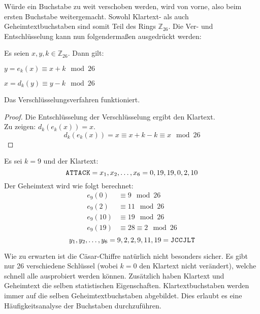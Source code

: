 \noindent
Würde ein Buchstabe zu weit verschoben werden, wird von vorne,
also beim ersten Buchstabe weitergemacht.
Sowohl Klartext- als auch Geheimtextbuchstaben sind somit Teil des Rings $\mathbb{Z}_{26}$.
Die Ver- und Entschlüsselung kann nun folgendermaßen ausgedrückt werden:

\begin{definition}
  Es seien $x,y,k \in \mathbb{Z}_{26}$. Dann gilt:
  \begin{description}[itemsep = 0pt]
    \item[Verschlüsselung:] $y = e_k(x) \equiv x + k \mod{26}$
    \item[Entschlüsselung:] $x = d_k(y) \equiv y - k \mod{26}$
  \end{description}
\end{definition}

\newpage
\noindent
Das Verschlüsselungsverfahren funktioniert.
\begin{proof}
  Die Entschlüsselung der Verschlüsselung ergibt den Klartext. \\
  Zu zeigen: $d_k(e_k(x)) = x$.
  \begin{equation*}
    d_k(e_k(x)) = x \equiv x + k - k \equiv x \mod{26}
  \end{equation*}
\end{proof}
\begin{example}
  Es sei $k = 9$ und der Klartext:
  \begin{equation*}
    \text{\texttt{A\kern 0.2mmT\kern 0.2mmT\kern 0.2mmA\kern 0.2mmC\kern 0.2mmK}}
    = x_1,x_2,\dots,x_6 = 0,19,19,0,2,10
  \end{equation*}
  Der Geheimtext wird wie folgt berechnet:
  \begin{align*}
    e_9(0)  & \equiv 9 \mod{26}           \\
    e_9(2)  & \equiv 11 \mod{26}          \\
    e_9(10) & \equiv 19 \mod{26}          \\
    e_9(19) & \equiv 28 \equiv 2 \mod{26}
  \end{align*}
  \begin{equation*}
    y_1,y_2,\dots,y_6 = 9,2,2,9,11,19 =
    \text{\texttt{J\kern 0.2mmC\kern 0.2mmC\kern 0.2mmJ\kern 0.2mmL\kern 0.2mmT}}
  \end{equation*}
\end{example}

\noindent
Wie zu erwarten ist die Cäsar-Chiffre natürlich nicht besonders sicher.
Es gibt nur 26 verschiedene Schlüssel (wobei $k = 0$ den Klartext nicht verändert),
welche schnell alle ausprobiert werden können. Zusätzlich
haben Klartext und Geheimtext die selben statistischen Eigenschaften.
Klartextbuchstaben werden immer auf die selben Geheimtextbuchstaben abgebildet. Dies
erlaubt es eine Häufigkeitsanalyse der Buchstaben durchzuführen.